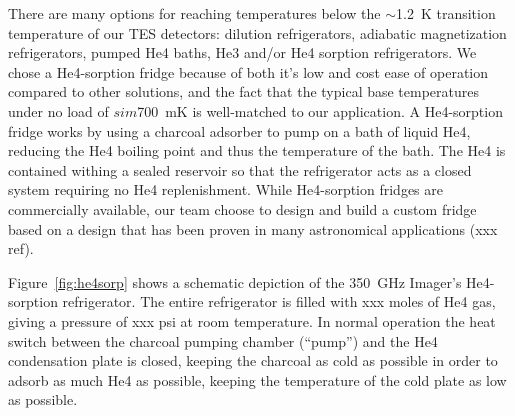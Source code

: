 \documentclass[10pt,twocolumn,article]{memoir}
\newcommand{\figref}[1]{Figure~\ref{#1}}
\newcommand{\TES}{{\small TES}\xspace}
\newcommand{\He}[1]{He#1\xspace}
\begin{document}
There are many options for reaching temperatures below the $\sim$1.2~K transition temperature of our \TES detectors: dilution refrigerators, adiabatic magnetization refrigerators, pumped \He4 baths, \He3 and/or \He4 sorption refrigerators.
We chose a \He4-sorption fridge because of both it's low and cost ease of operation compared to other solutions, and the fact that the typical base temperatures under no load of $sim$700~mK is well-matched to our application.
A  \He4-sorption fridge works by using a charcoal adsorber to pump on a bath of liquid \He4, reducing the \He4 boiling point and thus the temperature of the bath.
The \He4 is contained withing a sealed reservoir so that the refrigerator acts as a closed system requiring no \He4 replenishment. 
While \He4-sorption fridges are commercially available, our team choose to design and build a custom fridge based on a design that has been proven in many astronomical applications (xxx ref).

\figref{fig:he4sorp} shows a schematic depiction of the 350~GHz Imager's \He4-sorption refrigerator.
The entire refrigerator is filled with xxx moles of \He4 gas, giving a pressure of xxx psi at room temperature.
In normal operation the heat switch between the charcoal pumping chamber (``pump'') and the \He4 condensation plate is closed, keeping the charcoal as cold as possible in order to adsorb as much \He4 as possible, keeping the temperature of the cold plate as low as possible.
\end{document}
